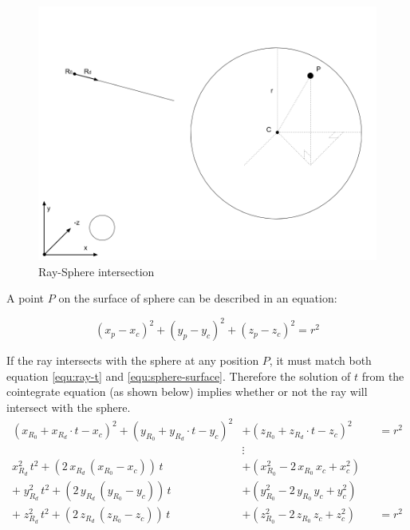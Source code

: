 \begin{figure}[H]
\caption{Ray-Sphere intersection}
\label{fig:ray-sphere}
\centering
\includegraphics[width=\textwidth, keepaspectratio]{Figures/ray-sphere-intersection.png}
\decoRule
\end{figure}

A point $P$ on the surface of sphere can be described in an equation:

\begin{equation}
\label{equ:sphere-surface}
(x_p - x_c)^2 + (y_p - y_c)^2 + (z_p - z_c)^2 = r^2
\end{equation}

If the ray intersects with the sphere at any position $P$, it must match both equation \ref{equ:ray-t} and \ref{equ:sphere-surface}. Therefore the solution of $t$ from the cointegrate equation (as shown below) implies whether or not the ray will intersect with the sphere.
\[
\begin{aligned}
(x_{R_0} + x_{R_d} \cdot t - x_c)^2 + (y_{R_0} + y_{R_d} \cdot t - y_c)^2 &+ (z_{R_0} + z_{R_d} \cdot t - z_c)^2 &&= r^2\\
&\vdots\\
x_{R_d}^2\,t^2 + (2\,x_{R_d}\,(x_{R_0} - x_c))\,t &+ (x_{R_0}^2 - 2\,x_{R_0}\,x_c + x_c^2)\\
+\;y_{R_d}^2\,t^2 + (2\,y_{R_d}\,(y_{R_0} - y_c))\,t &+ (y_{R_0}^2 - 2\,y_{R_0}\,y_c + y_c^2)\\
+\;z_{R_d}^2\,t^2 + (2\,z_{R_d}\,(z_{R_0} - z_c))\,t &+ (z_{R_0}^2 - 2\,z_{R_0}\,z_c + z_c^2) &&= r^2\\
\end{aligned}
\]


